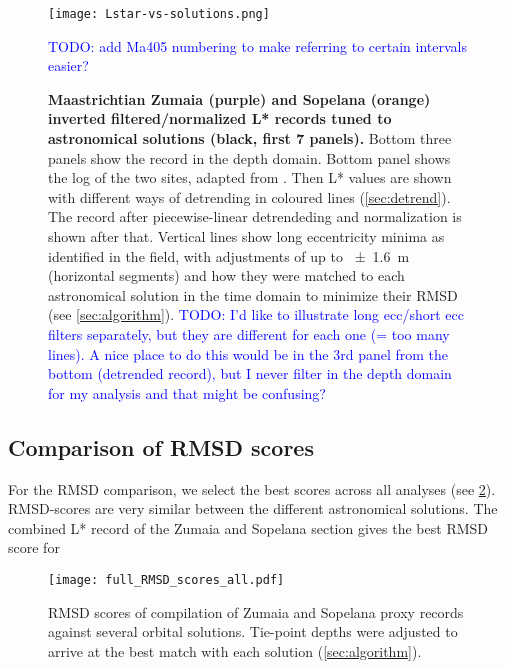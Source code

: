 \documentclass[draft]{agujournal2019}
\newcommand{\ijk}{\textcolor{blue}}
\begin{document}
\begin{figure}[htb]
  \centering
  \texttt{[image: Lstar-vs-solutions.png]}
  \caption{\label{fig:rolling-depth-age}
    \textbf{Maastrichtian Zumaia (purple) and Sopelana (orange) inverted filtered/normalized \gls{L*} records tuned to astronomical solutions (black, first 7 panels).}
    Bottom three panels show the record in the depth domain.
    Bottom panel shows the log of the two sites, adapted from .
    Then \gls{L*} values are shown with different ways of detrending in coloured lines (\cref{sec:detrend}).
    The record after piecewise-linear detrendeding and normalization is shown after that.
    Vertical lines show long eccentricity minima as identified in the field,
    with adjustments of up to \qty{\pm1.6}{\metre} (horizontal segments)
    and how they were matched to each astronomical solution in the time domain to minimize their \gls{RMSD} (see \cref{sec:algorithm}).
    \ijk{TODO: I'd like to illustrate long ecc/short ecc filters separately,
         but they are different for each one (= too many lines).
         A nice place to do this would be in the 3rd panel from the bottom (detrended record),
         but I never filter in the depth domain for my analysis and that might be confusing?}
    }
    \ijk{TODO: add Ma405 numbering to make referring to certain intervals easier?}
\end{figure}

\subsection{Comparison of RMSD scores}


For the RMSD comparison, we select the best scores across all analyses (see \cref{fig:full-RMSD-all}).
\gls{RMSD}-scores are very similar between the different astronomical solutions.
The combined \gls{L*} record of the Zumaia and Sopelana section gives the best \gls{RMSD} score for

\setcounter{figure}{2000}
\begin{figure}[htb]
    \centering
    \texttt{[image: full\_RMSD\_scores\_all.pdf]}
    \caption{\label{fig:full-RMSD-all}
        \gls{RMSD} scores of compilation of Zumaia and Sopelana proxy records against several orbital solutions.
        Tie-point depths were adjusted to arrive at the best match with each solution (\cref{sec:algorithm}).
    }
\end{figure}
\end{document}
